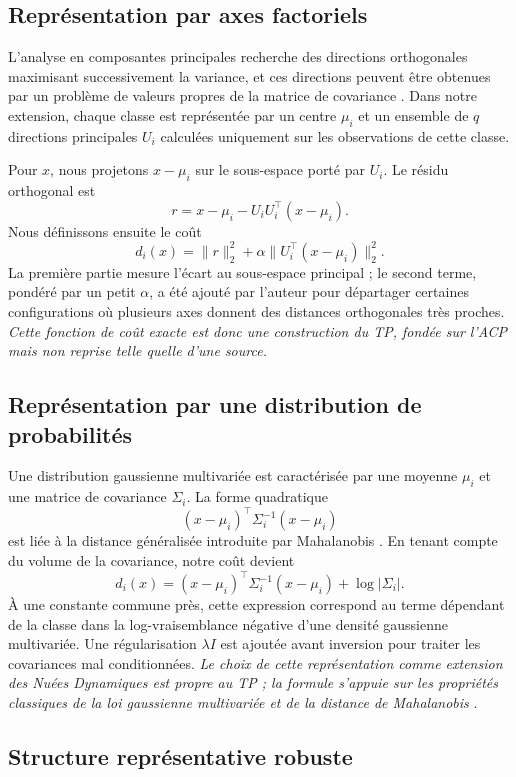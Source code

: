 \documentclass[12pt,a4paper]{article}
\begin{document}
\subsection{Représentation par axes factoriels}

L'analyse en composantes principales recherche des directions orthogonales maximisant successivement la variance, et ces directions peuvent être obtenues par un problème de valeurs propres de la matrice de covariance \cite{jolliffe2016}. Dans notre extension, chaque classe est représentée par un centre $\mu_i$ et un ensemble de $q$ directions principales $U_i$ calculées uniquement sur les observations de cette classe.

Pour $x$, nous projetons $x-\mu_i$ sur le sous-espace porté par $U_i$. Le résidu orthogonal est
\[
r=x-\mu_i-U_iU_i^\top(x-\mu_i).
\]
Nous définissons ensuite le coût
\[
d_i(x)=\|r\|_2^2+\alpha\|U_i^\top(x-\mu_i)\|_2^2.
\]
La première partie mesure l'écart au sous-espace principal ; le second terme, pondéré par un petit $\alpha$, a été ajouté par l'auteur pour départager certaines configurations où plusieurs axes donnent des distances orthogonales très proches. \textit{Cette fonction de coût exacte est donc une construction du TP, fondée sur l'ACP mais non reprise telle quelle d'une source.}

\subsection{Représentation par une distribution de probabilités}

Une distribution gaussienne multivariée est caractérisée par une moyenne $\mu_i$ et une matrice de covariance $\Sigma_i$. La forme quadratique
\[
(x-\mu_i)^\top\Sigma_i^{-1}(x-\mu_i)
\]
est liée à la distance généralisée introduite par Mahalanobis \cite{mahalanobis1936}. En tenant compte du volume de la covariance, notre coût devient
\[
d_i(x)=(x-\mu_i)^\top\Sigma_i^{-1}(x-\mu_i)+\log|\Sigma_i|.
\]
À une constante commune près, cette expression correspond au terme dépendant de la classe dans la log-vraisemblance négative d'une densité gaussienne multivariée. Une régularisation $\lambda I$ est ajoutée avant inversion pour traiter les covariances mal conditionnées. \textit{Le choix de cette représentation comme extension des Nuées Dynamiques est propre au TP ; la formule s'appuie sur les propriétés classiques de la loi gaussienne multivariée et de la distance de Mahalanobis} \cite{mahalanobis1936}.

\subsection{Structure représentative robuste}
\end{document}
